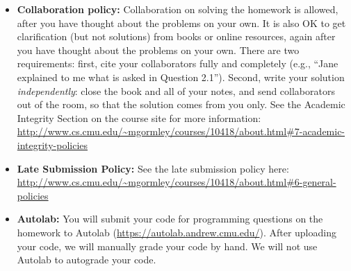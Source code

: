 \documentclass[11pt,addpoints,answers]{exam}
\numberwithin{equation}{section} %
\numberwithin{figure}{section} %
\numberwithin{table}{section} %
\begin{document}
\begin{itemize}
\item \textbf{Collaboration policy:} Collaboration on solving the homework is allowed, after you have thought about the problems on your own. It is also OK to get clarification (but not solutions) from books or online resources, again after you have thought about the problems on your own. There are two requirements: first, cite your collaborators fully and completely (e.g., ``Jane explained to me what is asked in Question 2.1''). Second, write your solution {\em independently}: close the book and all of your notes, and send collaborators out of the room, so that the solution comes from you only.  See the Academic Integrity Section on the course site for more information: \url{http://www.cs.cmu.edu/~mgormley/courses/10418/about.html#7-academic-integrity-policies}

\item\textbf{Late Submission Policy:} See the late submission policy here: \url{http://www.cs.cmu.edu/~mgormley/courses/10418/about.html#6-general-policies}




\item \textbf{Autolab:} You will submit your code for programming questions on the homework to Autolab (\url{https://autolab.andrew.cmu.edu/}). After uploading your code,
we will manually grade your code by hand. We will not use Autolab to autograde your code.


\end{itemize}
\end{document}
